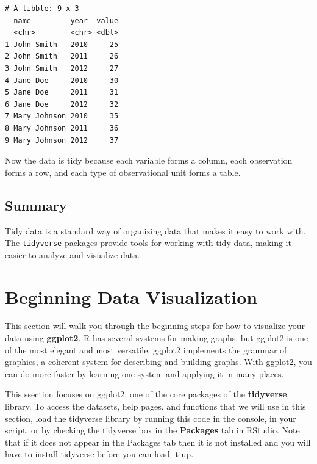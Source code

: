 \documentclass[
  letterpaper,
  DIV=11,
  numbers=noendperiod]{scrreprt}
\begin{document}
\begin{verbatim}
# A tibble: 9 x 3
  name         year  value
  <chr>        <chr> <dbl>
1 John Smith   2010     25
2 John Smith   2011     26
3 John Smith   2012     27
4 Jane Doe     2010     30
5 Jane Doe     2011     31
6 Jane Doe     2012     32
7 Mary Johnson 2010     35
8 Mary Johnson 2011     36
9 Mary Johnson 2012     37
\end{verbatim}

Now the data is tidy because each variable forms a column, each
observation forms a row, and each type of observational unit forms a
table.

\section*{Summary}\label{summary}


Tidy data is a standard way of organizing data that makes it easy to
work with. The \texttt{tidyverse} packages provide tools for working
with tidy data, making it easier to analyze and visualize data.


\chapter*{Beginning Data
Visualization}\label{beginning-data-visualization}


This section will walk you through the beginning steps for how to
visualize your data using \textbf{ggplot2}. R has several systems for
making graphs, but ggplot2 is one of the most elegant and most
versatile. ggplot2 implements the grammar of graphics, a coherent system
for describing and building graphs. With ggplot2, you can do more faster
by learning one system and applying it in many places.

This ssection focuses on ggplot2, one of the core packages of the
\textbf{tidyverse} library. To access the datasets, help pages, and
functions that we will use in this section, load the tidyverse library
by running this code in the console, in your script, or by checking the
tidyverse box in the \textbf{Packages} tab in RStudio. Note that if it
does not appear in the Packages tab then it is not installed and you
will have to install tidyverse before you can load it up.
\end{document}
